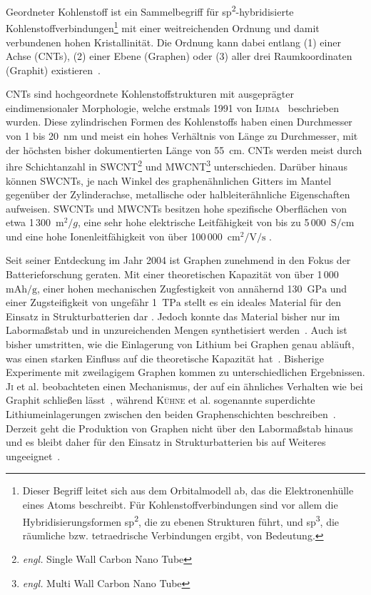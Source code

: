 Geordneter Kohlenstoff ist ein Sammelbegriff für sp\textsuperscript{2}-hybridisierte Kohlenstoffverbindungen\footnote{Dieser Begriff leitet sich aus dem Orbitalmodell ab, das die Elektronenhülle eines Atoms beschreibt. Für Kohlenstoffverbindungen sind vor allem die Hybridisierungsformen sp\textsuperscript{2}, die zu ebenen Strukturen führt, und sp\textsuperscript{3}, die räumliche bzw. tetraedrische Verbindungen ergibt, von Bedeutung.} mit einer weitreichenden Ordnung und damit verbundenen hohen Kristallinität. Die Ordnung kann dabei entlang (1) einer Achse (CNTs), (2) einer Ebene (Graphen) oder (3) aller drei Raumkoordinaten (Graphit) existieren~\cite{Wang2021}.

CNTs sind hochgeordnete Kohlenstoffstrukturen mit ausgeprägter eindimensionaler Morphologie, welche erstmals 1991 von \textsc{Iijima}~\cite{Iijima1991} beschrieben wurden. Diese zylindrischen Formen des Kohlenstoffs haben einen Durchmesser von 1 bis 20~$\si{\nano\metre}$ und meist ein hohes Verhältnis von Länge zu Durchmesser, mit der höchsten bisher dokumentierten Länge von 55~$\si{\centi\metre}$. CNTs werden meist durch ihre Schichtanzahl in SWCNT\footnote{\textit{engl.} Single Wall Carbon Nano Tube} und MWCNT\footnote{\textit{engl.} Multi Wall Carbon Nano Tube} unterschieden. Darüber hinaus können SWCNTs, je nach Winkel des graphenähnlichen Gitters im Mantel gegenüber der Zylinderachse, metallische oder halbleiterähnliche Eigenschaften aufweisen. 
SWCNTs und MWCNTs besitzen hohe spezifische Oberflächen von etwa 1\,300~$\si{\m^2\per g}$, eine sehr hohe elektrische Leitfähigkeit von bis zu 5\,000~$\si{\siemens \per \cm}$ und eine hohe Ionenleitfähigkeit von über 100\,000~$\si{\cm \squared \per \V \per \s}$ \cite{Xu2011,Uetani2014,Charlier2007}.

Seit seiner Entdeckung im Jahr 2004 \cite{Novoselov2004} ist Graphen zunehmend in den Fokus der Batterieforschung geraten. Mit einer theoretischen Kapazität von über 1\,000~$\si{\mA \hour \per \g}$, einer hohen mechanischen Zugfestigkeit von annähernd 130~$\si{\GPa}$ und einer Zugsteifigkeit von ungefähr 1~$\si{\tera \Pa}$ stellt es ein ideales Material für den Einsatz in Strukturbatterien dar \cite{Novoselov2012}. Jedoch konnte das Material bisher nur im Labormaßstab und in unzureichenden Mengen synthetisiert werden~\cite{Shams2015}. Auch ist bisher umstritten, wie die Einlagerung von Lithium bei Graphen genau abläuft, was einen starken Einfluss auf die theoretische Kapazität hat~\cite{Safie2023, Singh2024}. Bisherige Experimente mit zweilagigem Graphen kommen zu unterschiedlichen Ergebnissen. \textsc{Ji} et al. beobachteten einen Mechanismus, der auf ein ähnliches Verhalten wie bei Graphit schließen lässt~\cite{Ji2019}, während \textsc{Kühne} et al. sogenannte superdichte Lithiumeinlagerungen zwischen den beiden Graphenschichten beschreiben~\cite{Kuehne2017}. Derzeit geht die Produktion von Graphen nicht über den Labormaßstab hinaus und es bleibt daher für den Einsatz in Strukturbatterien bis auf Weiteres ungeeignet~\cite{Zhu2014, Singh2024}.


